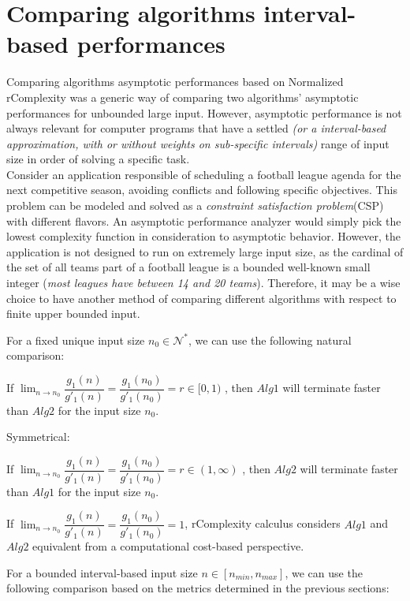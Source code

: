 \section{Comparing algorithms interval-based performances}
Comparing algorithms asymptotic performances based on Normalized rComplexity was a generic way of comparing two algorithms' asymptotic performances for unbounded large input. However, asymptotic performance is not always relevant for computer programs that have a settled \textit{(or a interval-based approximation, with or without weights on sub-specific intervals)} range of input size in order of solving a specific task. 
\\ Consider an application responsible of scheduling a football league agenda for the next competitive season, avoiding conflicts and following specific objectives. This problem can be modeled and solved as a \textit{constraint satisfaction problem}(CSP) with different flavors.  An asymptotic performance analyzer would simply pick the lowest complexity function in consideration to asymptotic behavior. However, the application is not designed to run on extremely large input size, as the cardinal of the set of all teams part of a football league is a bounded well-known small integer (\textit{most leagues have between 14 and 20 teams}). Therefore, it may be a wise choice to have another method of comparing different algorithms with respect to finite upper bounded input.

For a fixed unique input size $n_{0}\in \mathcal{N}^{*}$, we can use the following natural comparison:
\begin{lemma}
If  $ \lim_{n\to n_{0}} \dfrac{g_{1}(n)}{g'_{1}(n)} = \dfrac{g_{1}(n_{0})}{g'_{1}(n_{0})} = r \in [0,1) $ , then $Alg1$ will terminate faster than $Alg2$ for the input size $n_{0}$.
\end{lemma}
Symmetrical:
\begin{lemma}
If  $ \lim_{n\to n_{0}} \dfrac{g_{1}(n)}{g'_{1}(n)} = \dfrac{g_{1}(n_{0})}{g'_{1}(n_{0})} = r \in (1,\infty) $ , then $Alg2$ will terminate faster than $Alg1$ for the input size $n_{0}$.
\end{lemma}
\begin{remark}
If  $ \lim_{n\to n_{0}} \dfrac{g_{1}(n)}{g'_{1}(n)} = \dfrac{g_{1}(n_{0})}{g'_{1}(n_{0})} = 1$, rComplexity calculus considers $Alg1$ and $Alg2$ equivalent from a computational cost-based perspective.
\end{remark}

For a bounded interval-based input size $n \in [n_{min}, n_{max}]$, we can use the following comparison based on the metrics determined in the previous sections:

